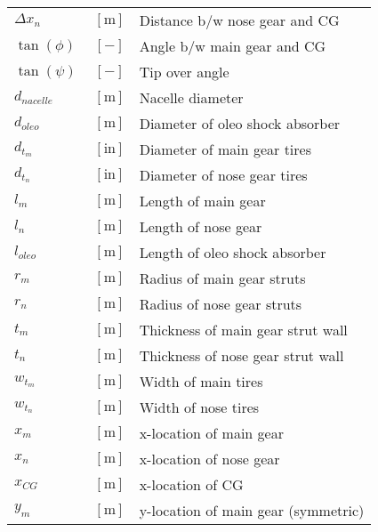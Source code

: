 \documentclass[12pt]{article}
\begin{document}
{\begin{supertabular}{lcl}
$\Delta x_n$ & $~\mathrm{[m]}$ & Distance b/w nose gear and CG \\
$\tan(\phi)$ & $~[-]$ & Angle b/w main gear and CG \\
$\tan(\psi)$ & $~[-]$ & Tip over angle \\
$d_{nacelle}$ & $~\mathrm{[m]}$ & Nacelle diameter \\
$d_{oleo}$ & $~\mathrm{[m]}$ & Diameter of oleo shock absorber \\
$d_{t_m}$ & $~\mathrm{[in]}$ & Diameter of main gear tires \\
$d_{t_n}$ & $~\mathrm{[in]}$ & Diameter of nose gear tires \\
$l_m$ & $~\mathrm{[m]}$ & Length of main gear \\
$l_n$ & $~\mathrm{[m]}$ & Length of nose gear \\
$l_{oleo}$ & $~\mathrm{[m]}$ & Length of oleo shock absorber \\
$r_m$ & $~\mathrm{[m]}$ & Radius of main gear struts \\
$r_n$ & $~\mathrm{[m]}$ & Radius of nose gear struts \\
$t_m$ & $~\mathrm{[m]}$ & Thickness of main gear strut wall \\
$t_n$ & $~\mathrm{[m]}$ & Thickness of nose gear strut wall \\
$w_{t_m}$ & $~\mathrm{[m]}$ & Width of main tires \\
$w_{t_n}$ & $~\mathrm{[m]}$ & Width of nose tires \\
$x_m$ & $~\mathrm{[m]}$ & x-location of main gear \\
$x_n$ & $~\mathrm{[m]}$ & x-location of nose gear \\
$x_{CG}$ & $~\mathrm{[m]}$ & x-location of CG \\
$y_m$ & $~\mathrm{[m]}$ & y-location of main gear (symmetric) \\
\bottomrule
\end{supertabular}}

 
\end{document}
